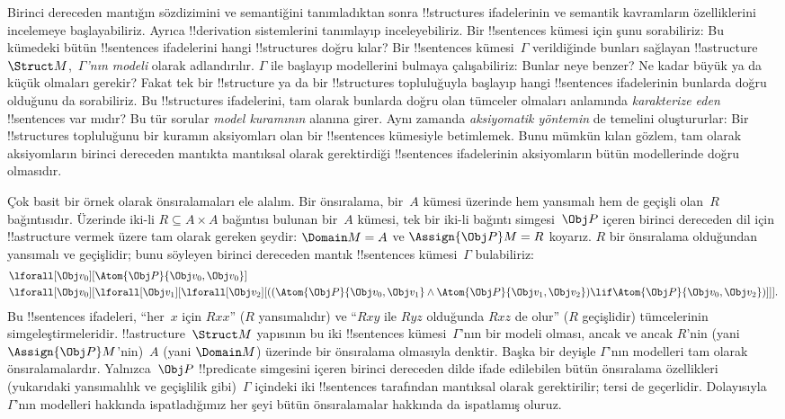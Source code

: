 \documentclass[../../../include/open-logic-section]{subfiles}
\begin{document}


Birinci dereceden mantığın sözdizimini ve semantiğini tanımladıktan
sonra !!{structure}s ifadelerinin ve semantik kavramların özelliklerini
incelemeye başlayabiliriz. Ayrıca !!{derivation} sistemlerini tanımlayıp
inceleyebiliriz. Bir !!{sentence}s kümesi için şunu sorabiliriz: Bu
kümedeki bütün !!{sentence}s ifadelerini hangi !!{structure}s doğru
kılar? Bir !!{sentence}s kümesi~$\Gamma$ verildiğinde bunları sağlayan
!!a{structure}~$\Struct M$,~\emph{$\Gamma$'nın modeli} olarak
adlandırılır. $\Gamma$ ile başlayıp modellerini bulmaya çalışabiliriz:
Bunlar neye benzer? Ne kadar büyük ya da küçük olmaları gerekir? Fakat
tek bir !!{structure} ya da bir !!{structure}s topluluğuyla başlayıp
hangi !!{sentence}s ifadelerinin bunlarda doğru olduğunu da sorabiliriz.
Bu !!{structure}s ifadelerini, tam olarak bunlarda doğru olan tümceler
olmaları anlamında \emph{karakterize eden} !!{sentence}s var mıdır?
Bu tür sorular \emph{model kuramının} alanına girer. Aynı zamanda
\emph{aksiyomatik yöntemin} de temelini oluştururlar: Bir
!!{structure}s topluluğunu bir kuramın aksiyomları olan bir
!!{sentence}s kümesiyle betimlemek. Bunu mümkün kılan gözlem, tam
olarak aksiyomların birinci dereceden mantıkta mantıksal olarak
gerektirdiği !!{sentence}s ifadelerinin aksiyomların bütün modellerinde
doğru olmasıdır.

Çok basit bir örnek olarak önsıralamaları ele alalım. Bir önsıralama,
bir~$A$ kümesi üzerinde hem yansımalı hem de geçişli olan~$R$
bağıntısıdır. Üzerinde iki-li $R\subseteq A\times A$ bağıntısı bulunan
bir~$A$ kümesi, tek bir iki-li bağıntı simgesi~$\Obj P$ içeren birinci
dereceden dil için !!a{structure} vermek üzere tam olarak gereken
şeydir: $\Domain M=A$ ve $\Assign{\Obj P}M=R$ koyarız. $R$ bir
önsıralama olduğundan yansımalı ve geçişlidir; bunu söyleyen birinci
dereceden mantık !!{sentence}s kümesi~$\Gamma$ bulabiliriz:
\begin{align*}
  & \lforall[\Obj v_0][\Atom{\Obj P}{\Obj v_0,\Obj v_0}]\\
  & \lforall[\Obj v_0][\lforall[\Obj v_1][\lforall[\Obj v_2][((\Atom{\Obj P}{\Obj v_0,\Obj v_1} \land \Atom{\Obj P}{\Obj v_1,\Obj v_2}) \lif \Atom{\Obj P}{\Obj v_0,\Obj v_2})]]].
\end{align*}
Bu !!{sentence}s ifadeleri, ``her~$x$ için $Rxx$'' ($R$ yansımalıdır)
ve ``$Rxy$ ile $Ryz$ olduğunda $Rxz$ de olur'' ($R$ geçişlidir)
tümcelerinin simgeleştirmeleridir. !!a{structure}~$\Struct M$ yapısının
bu iki !!{sentence}s kümesi~$\Gamma$'nın bir modeli olması, ancak ve
ancak $R$'nin (yani $\Assign{\Obj P}M$'nin)~$A$ (yani $\Domain M$)
üzerinde bir önsıralama olmasıyla denktir. Başka bir deyişle
$\Gamma$'nın modelleri tam olarak önsıralamalardır. Yalnızca~$\Obj P$
!!{predicate} simgesini içeren birinci dereceden dilde ifade edilebilen
bütün önsıralama özellikleri (yukarıdaki yansımalılık ve geçişlilik
gibi)~$\Gamma$ içindeki iki !!{sentence}s tarafından mantıksal olarak
gerektirilir; tersi de geçerlidir. Dolayısıyla~$\Gamma$'nın modelleri
hakkında ispatladığımız her şeyi bütün önsıralamalar hakkında da
ispatlamış oluruz.
\end{document}
